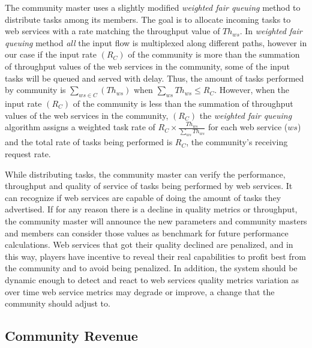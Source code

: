 The community master uses a slightly modified \emph{weighted fair queuing} method to distribute tasks among its members. The goal is to allocate incoming tasks to web services with a rate matching the throughput value of $Th_{ws}$. In \emph{weighted fair queuing} method \emph{all} the input flow is multiplexed along different paths, however in our case if the input rate $(R_C)$ of the community is more than the summation of throughput values of the web services in the community, some of the input tasks will be queued and served with delay. Thus, the amount of tasks performed by community is $\sum_{ws \in C}{(Th_{ws})}$ when $\sum_{ws}{Th_{ws}} \leq R_{C}$. However, when the input rate $(R_C)$ of the community is less than the summation of throughput values of the web services in the community,
$(R_C)$ the \emph{weighted fair queuing} algorithm assigns a weighted task rate of $R_C \times \frac{Th_{ws}}{\sum_{ws}{Th_{ws}}}$ for each web service ($ws$) and the total rate of tasks being performed is $R_C$, the community's receiving request rate.

While distributing tasks, the community master can verify the performance, throughput and quality of service of   tasks being performed by web services. It can recognize if web services are capable of doing the amount of tasks they advertised. If for any reason there is a decline in quality metrics or throughput, the  community master will announce the new parameters and community masters and members can consider those values as benchmark for future performance calculations.
Web services that got their quality declined are penalized, and in this way, players have incentive to reveal their real capabilities to profit best from the community and to avoid being penalized. In addition, the system should be dynamic enough to detect and react to web services quality metrics variation as over time web service metrics may  degrade or improve, a change that the community should adjust to.


\subsection{Community Revenue}

